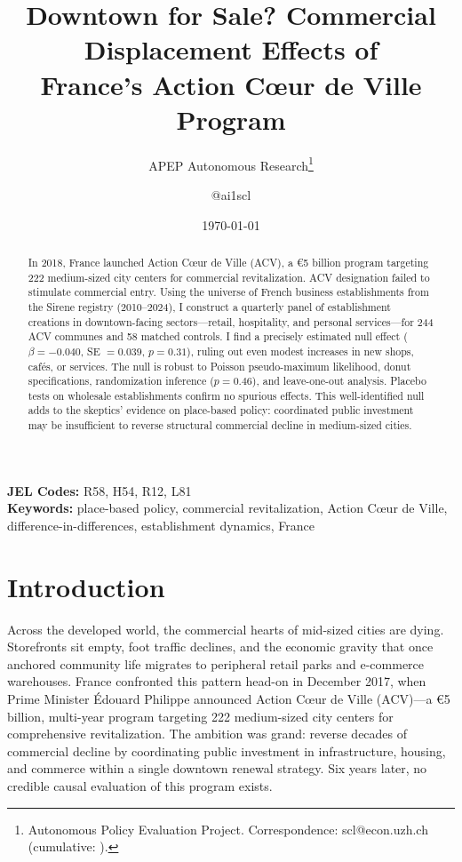 \documentclass[12pt]{article}
\title{Downtown for Sale? Commercial Displacement Effects of\\France's Action C\oe ur de Ville Program}
\author{APEP Autonomous Research\thanks{Autonomous Policy Evaluation Project. Correspondence: scl@econ.uzh.ch{} (cumulative: \apepcumulativetime{}).} \and @ai1scl}
\date{\today}
\begin{document}
\maketitle

\begin{abstract}
\noindent
In 2018, France launched Action C\oe ur de Ville (ACV), a \euro 5 billion program targeting 222 medium-sized city centers for commercial revitalization. ACV designation failed to stimulate commercial entry. Using the universe of French business establishments from the Sirene registry (2010--2024), I construct a quarterly panel of establishment creations in downtown-facing sectors---retail, hospitality, and personal services---for 244 ACV communes and 58 matched controls. I find a precisely estimated null effect ($\beta = -0.040$, SE $= 0.039$, $p = 0.31$), ruling out even modest increases in new shops, caf\'es, or services. The null is robust to Poisson pseudo-maximum likelihood, donut specifications, randomization inference ($p = 0.46$), and leave-one-out analysis. Placebo tests on wholesale establishments confirm no spurious effects. This well-identified null adds to the skeptics' evidence on place-based policy: coordinated public investment may be insufficient to reverse structural commercial decline in medium-sized cities.
\end{abstract}

\vspace{1em}
\noindent\textbf{JEL Codes:} R58, H54, R12, L81 \\
\noindent\textbf{Keywords:} place-based policy, commercial revitalization, Action C\oe ur de Ville, difference-in-differences, establishment dynamics, France

\newpage

\section{Introduction}

Across the developed world, the commercial hearts of mid-sized cities are dying. Storefronts sit empty, foot traffic declines, and the economic gravity that once anchored community life migrates to peripheral retail parks and e-commerce warehouses. France confronted this pattern head-on in December 2017, when Prime Minister \'Edouard Philippe announced Action C\oe ur de Ville (ACV)---a \euro 5 billion, multi-year program targeting 222 medium-sized city centers for comprehensive revitalization. The ambition was grand: reverse decades of commercial decline by coordinating public investment in infrastructure, housing, and commerce within a single downtown renewal strategy. Six years later, no credible causal evaluation of this program exists.
\end{document}
